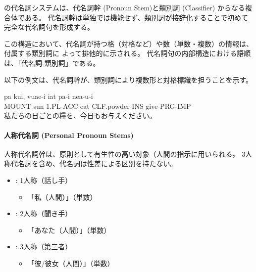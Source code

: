 \langname の代名詞システムは、代名詞幹 (Pronoun Stem)と類別詞 (Classifier) 
からなる複合体である。
代名詞幹は単独では機能せず、類別詞が接辞化することで初めて完全な代名詞句を形成する。

この構造において、代名詞が持つ格（対格など）や数（単数・複数）の情報は、付属する類別詞に
よって排他的に示される。
代名詞句の内部構造における語順は、「代名詞-類別詞」である。

以下の例文は、代名詞幹が、類別詞により複数形と対格標識を担うことを示す。

\begin{exe}
    \ex \gll pa kui, vuae-i iat pa-i nea-u-i \\
        MOUNT sun 1.PL-ACC eat CLF.powder-INS give-PRG-IMP \\
        \glt 私たちの日ごとの糧を、今日もお与えください。
\end{exe}

\paragraph{人称代名詞 (Personal Pronoun Stems)}
人称代名詞幹は、原則として{有生性の高い対象（人間}の指示に用いられる。
3人称代名詞を含め、代名詞は性差による区別を持たない。

\begin{itemize}
    \item \textbf{} : 1人称（話し手）
        \begin{itemize}
            \item {} %
            \quad 「私（人間）」（単数）
        \end{itemize}
    \item \textbf{} : 2人称（聞き手）
        \begin{itemize}
            \item {} %
            \quad 「あなた（人間）」（単数）
    \end{itemize}
    \item \textbf{} : 3人称（第三者）
        \begin{itemize}
            \item {} %
            \quad 「彼/彼女（人間）」（単数）
        \end{itemize}
\end{itemize}

